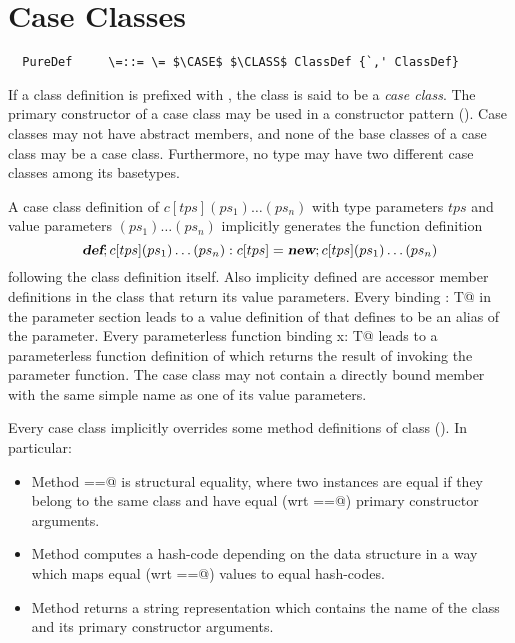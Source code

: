 \documentclass[11pt]{report}
\begin{document}
\section{Case Classes}
\label{sec:datadef}

\syntax\begin{verbatim}
  PureDef     \=::= \= $\CASE$ $\CLASS$ ClassDef {`,' ClassDef}
\end{verbatim}

If a class definition is prefixed with \verb@case@, the class is said
to be a {\em case class}.  The primary constructor of a case class may
be used in a constructor pattern ().  Case classes
may not have abstract members, and none of the base classes of a case
class may be a case class. Furthermore, no type may have two different
case classes among its basetypes.

A case class definition of $c[tps](ps_1)\ldots(ps_n)$ with type
parameters $tps$ and value parameters $(ps_1)\ldots(ps_n)$ implicitly
generates the function definition
$$\mbox{\sl\bfseries def};c[tps](ps_1)\ldots(ps_n): c[tps] = \mbox{\sl\bfseries new};c[tps](ps_1)\ldots(ps_n)
$$
following the class definition itself.  Also implicity defined are
accessor member definitions in the class that return its value
parameters. Every binding \verb@x: T@ in the parameter section leads
to a value definition of \verb@x@ that defines \verb@x@
to be an alias of the parameter.  Every parameterless function binding
\verb@def x: T@ leads to a parameterless function definition of
\verb@x@ which returns the result of invoking the parameter function.
The case class may not contain a directly bound member with the same
simple name as one of its value parameters.

Every case class implicitly overrides some method definitions of class
\verb@Object@ (). In particular:
\begin{itemize}
\item[] Method \verb@==@ is structural equality, where two
instances are equal if they belong to the same class and
have equal (wrt \verb@==@) primary constructor arguments.
\item[] Method \verb@hashCode@ computes a hash-code
depending on the data structure in a way which maps equal (wrt
\verb@==@) values to equal hash-codes.
\item[] Method \verb@toString@ returns a string representation which
contains the name of the class and its primary constructor arguments.
\end{itemize}
\end{document}
